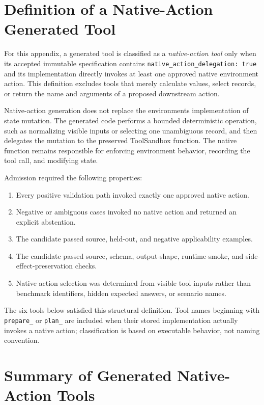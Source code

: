 \section{Definition of a Native-Action Generated
Tool}\label{definition-of-a-native-action-generated-tool}

For this appendix, a generated tool is classified as a
\emph{native-action tool} only when its accepted immutable specification
contains \texttt{native\_action\_delegation: true} and its
implementation directly invokes at least one approved native environment
action. This definition excludes tools that merely calculate values,
select records, or return the name and arguments of a proposed
downstream action.

Native-action generation does not replace the
environment\textquotesingle s implementation of state mutation. The
generated code performs a bounded deterministic operation, such as
normalizing visible inputs or selecting one unambiguous record, and then
delegates the mutation to the preserved ToolSandbox function. The native
function remains responsible for enforcing environment behavior,
recording the tool call, and modifying state.

Admission required the following properties:

\begin{enumerate}
\def\labelenumi{\arabic{enumi}.}
\tightlist
\item
  Every positive validation path invoked exactly one approved native
  action.
\item
  Negative or ambiguous cases invoked no native action and returned an
  explicit abstention.
\item
  The candidate passed source, held-out, and negative applicability
  examples.
\item
  The candidate passed source, schema, output-shape, runtime-smoke, and
  side-effect-preservation checks.
\item
  Native action selection was determined from visible tool inputs rather
  than benchmark identifiers, hidden expected answers, or scenario
  names.
\end{enumerate}

The six tools below satisfied this structural definition. Tool names
beginning with \texttt{prepare\_} or \texttt{plan\_} are included when
their stored implementation actually invokes a native action;
classification is based on executable behavior, not naming convention.

\section{Summary of Generated Native-Action
Tools}\label{summary-of-generated-native-action-tools}

